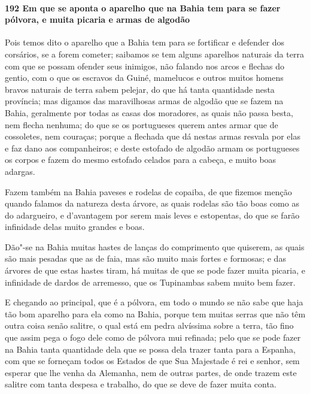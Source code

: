 \begin{linenumbers}
\paragraph{192 Em que se aponta o aparelho que na Bahia tem para se fazer pólvora, e muita
picaria e armas de algodão}\quad
Pois temos dito o aparelho que a Bahia tem para se fortificar e defender dos corsários, se
a forem cometer; saibamos se tem alguns aparelhos naturais da terra com que se possam
ofender seus inimigos, não falando nos arcos e flechas do gentio, com o que os escravos da
Guiné, mamelucos e outros muitos homens bravos naturais de terra sabem pelejar, do que há
tanta quantidade nesta província; mas digamos das maravilhosas armas de algodão que se
fazem na Bahia, geralmente por todas as casas dos moradores, as quais não passa besta, nem
flecha nenhuma; do que se os portugueses querem antes armar que de cossoletes, nem
couraças; porque a flechada que dá nestas armas resvala por elas e faz dano aos
companheiros; e deste estofado de algodão armam os portugueses os corpos e fazem do mesmo
estofado celados para a cabeça, e muito boas adargas.

Fazem também na Bahia paveses e rodelas de copaiba, de que fizemos menção quando falamos
da natureza desta árvore, as quais rodelas são tão boas como as do adargueiro, e
d'avantagem por serem mais leves e estopentas, do que se farão infinidade delas muito
grandes e boas.

Dão"-se na Bahia muitas hastes de lanças do comprimento que quiserem, as quais são mais
pesadas que as de faia, mas são muito mais fortes e formosas; e das árvores de que estas
hastes tiram, há muitas de que se pode fazer muita picaria, e infinidade de dardos de
arremesso, que os Tupinambas sabem muito bem fazer.

E chegando ao principal, que é a pólvora, em todo o mundo se não sabe que haja tão bom
aparelho para ela como na Bahia, porque tem muitas serras que não têm outra coisa senão
salitre, o qual está em pedra alvíssima sobre a terra, tão fino que assim pega o fogo dele
como de pólvora mui refinada; pelo que se pode fazer na Bahia tanta quantidade dela que se
possa dela trazer tanta para a Espanha, com que se forneçam todos os Estados de que Sua
Majestade é rei e senhor, sem esperar que lhe venha da Alemanha, nem de outras partes, de
onde trazem este salitre com tanta despesa e trabalho, do que se deve de fazer muita
conta.


\end{linenumbers}
